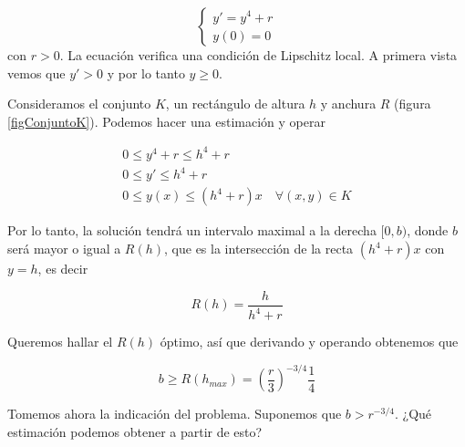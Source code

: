 \begin{example}
\[ \begin{cases}
y' = y^4 + r \\
y(0) = 0
\end{cases}
\] 
con $r>0$. La ecuación verifica una condición de Lipschitz local. A primera vista vemos que $y'>0$ y por lo tanto $y≥0$.

Consideramos el conjunto $K$, un rectángulo de altura $h$ y anchura $R$ (figura \ref{figConjuntoK}). Podemos hacer una estimación y operar

\begin{gather*}
0 ≤ y^4 + r ≤ h^4 + r \\
0 ≤ y' ≤ h^4 + r \\
0 ≤ y(x) ≤ (h^4+r)x \quad ∀(x,y) ∈ K
\end{gather*}

Por lo tanto, la solución tendrá un intervalo maximal a la derecha $[0,b)$, donde $b$ será mayor o igual a $R(h)$, que es la intersección de la recta $(h^4+r)x$ con $y=h$, es decir

\[ R(h) = \frac{h}{h^4+r} \]

Queremos hallar el $R(h)$ óptimo, así que derivando y operando obtenemos que

\[ b ≥ R(h_{max}) = \left(\frac{r}{3}\right)^{-3/4} \frac{1}{4} \]

Tomemos ahora la indicación del problema. Suponemos que $b>r^{-3/4}$. ¿Qué estimación podemos obtener a partir de esto? 
\end{example}



